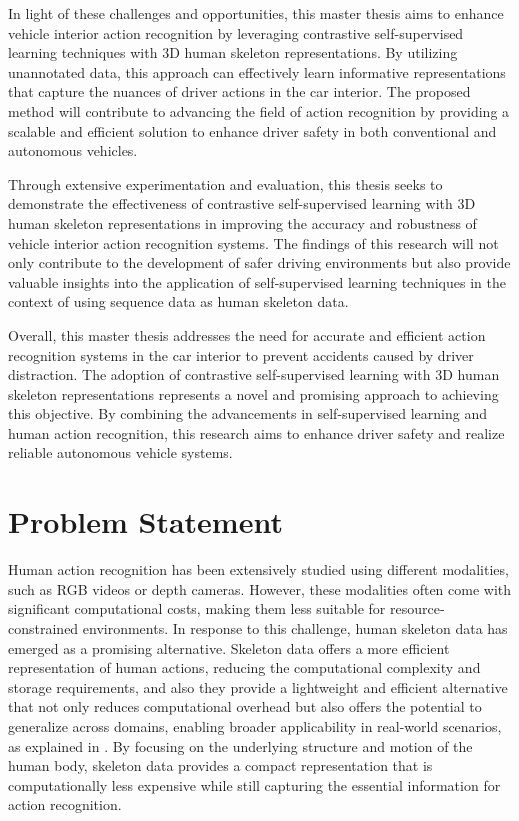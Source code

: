 In light of these challenges and opportunities, this master thesis aims to enhance vehicle interior action recognition by leveraging contrastive self-supervised learning techniques with 3D human skeleton representations. By utilizing unannotated data, this approach can effectively learn informative representations that capture the nuances of driver actions in the car interior. The proposed method will contribute to advancing the field of action recognition by providing a scalable and efficient solution to enhance driver safety in both conventional and autonomous vehicles.

Through extensive experimentation and evaluation, this thesis seeks to demonstrate the effectiveness of contrastive self-supervised learning with 3D human skeleton representations in improving the accuracy and robustness of vehicle interior action recognition systems. The findings of this research will not only contribute to the development of safer driving environments but also provide valuable insights into the application of self-supervised learning techniques in the context of using sequence data as human skeleton data.

Overall, this master thesis addresses the need for accurate and efficient action recognition systems in the car interior to prevent accidents caused by driver distraction. The adoption of contrastive self-supervised learning with 3D human skeleton representations represents a novel and promising approach to achieving this objective. By combining the advancements in self-supervised learning and human action recognition, this research aims to enhance driver safety and realize reliable autonomous vehicle systems.

\section{Problem Statement}
Human action recognition has been extensively studied using different modalities, such as RGB videos or depth cameras. However, these modalities often come with significant computational costs, making them less suitable for resource-constrained environments. In response to this challenge, human skeleton data has emerged as a promising alternative. Skeleton data offers a more efficient representation of human actions, reducing the computational complexity and storage requirements, and also they provide a lightweight and efficient alternative that not only reduces computational overhead but also offers the potential to generalize across domains, enabling broader applicability in real-world scenarios, as explained in \cite{martin2023viewpoint}. By focusing on the underlying structure and motion of the human body, skeleton data provides a compact representation that is computationally less expensive while still capturing the essential information for action recognition.

